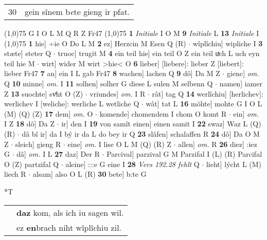 \documentclass[8pt,a4paper,notitlepage]{article}
\begin{document}
\begin{table}[ht]
\begin{minipage}[t]{0.5\linewidth}
\begin{tabular}{rl}
30 & gein sînem b\textit{e}te gieng ir pfat.\\ 
\end{tabular}
\scriptsize
\line(1,0){75} \newline
G I O L M Q R Z Fr47 \newline
\line(1,0){75} \newline
\textbf{1} \textit{Initiale} I O M  \textbf{9} \textit{Initiale} L  \textbf{13} \textit{Initiale} I  \newline
\line(1,0){75} \newline
\textbf{1} hie] ÷ie O Do L M \textbf{2} ez] Herzcin M Esen Q (R)  $\cdot$ wîplîchiu] wipliche I \textbf{3} stæte] steter Q  $\cdot$ truoc] trugit M \textbf{4} ein teil hie] ein teil O Z ein teil uͯch L uch eyn teil hie M  $\cdot$ wirt] wider M wirt >hie< O \textbf{6} lieber] [liebere]: lieber Z [liebert]: lieber Fr47 \textbf{7} an] ein I L gab Fr47 \textbf{8} wachen] lachen Q \textbf{9} dô] Da M Z  $\cdot$ gienc] \textit{om.} Q \textbf{10} minne] \textit{om.} I \textbf{11} solhen] solher G diese L sulen M selbenn Q  $\cdot$ namen] iamer Z \textbf{13} suochte] svͦht O (Z)  $\cdot$ vriundes] \textit{om.} I R  $\cdot$ rât] tag Q \textbf{14} werlîchiu] [herlichev]: werlichev I [weliche]: werliche L wetliche Q  $\cdot$ wât] tat L \textbf{16} möhte] mohte G I O L (M) (Q) (Z) \textbf{17} dem] \textit{om.} O  $\cdot$ komende] chomendem I chom O komt R  $\cdot$ ein] \textit{om.} I Z \textbf{18} dô] Da Z  $\cdot$ ir] den I \textbf{19} von samît einen] einen samit I \textbf{22} swaz] Waz L (Q) (R)  $\cdot$ dâ bî ir] da I bý ir da L do bey ir Q \textbf{23} slâfen] schalaffen R \textbf{24} dô] Da O M Z  $\cdot$ sleich] gieng R  $\cdot$ eine] \textit{om.} I lise O L M (Q) (R) Z  $\cdot$ allen] \textit{om.} R \textbf{26} diez] :iez G  $\cdot$ dâ] \textit{om.} I L \textbf{27} daz] Der R  $\cdot$ Parcival] parzival G M Parzifal I (L) (R) Parcifal O (Z) partzifal Q  $\cdot$ aleine] :::e G eine I \textbf{28} \textit{Vers 192.28 fehlt} Q   $\cdot$ lieht] lýcht L (M) liech R  $\cdot$ alsam] also O L (R) \textbf{30} bete] b:te G \newline
\end{minipage}
\hspace{0.5cm}
\begin{minipage}[t]{0.5\linewidth}
\small
\begin{center}*T
\end{center}
\begin{tabular}{rl}
 & \textbf{daz} kom, als ich iu sagen wil.\\ 
 & ez \textbf{en}brach niht wîplîchiu zil.\\ 

\end{tabular}
\end{minipage}
\end{table}
\end{document}
